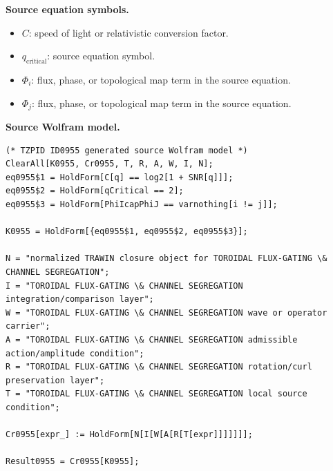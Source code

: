 \begin{minipage}[t]{0.49\linewidth}
\begingroup
\small
\raggedright
\textbf{Source equation symbols.}\par
\begin{itemize}[leftmargin=1.35em,itemsep=1pt,topsep=1pt,parsep=0pt]
    \item $C$: speed of light or relativistic conversion factor.
    \item $q_{\mathrm{critical}}$: source equation symbol.
    \item $\Phi_i$: flux, phase, or topological map term in the source equation.
    \item $\Phi_j$: flux, phase, or topological map term in the source equation.
\end{itemize}
\endgroup
\end{minipage}\hfill
\begin{minipage}[t]{0.47\linewidth}
\begingroup
\scriptsize
\raggedright
\textbf{Source Wolfram model.}\par
\begin{Verbatim}[fontsize=\tiny,breaklines=true,breakanywhere=true]
(* TZPID ID0955 generated source Wolfram model *)
ClearAll[K0955, Cr0955, T, R, A, W, I, N];
eq0955$1 = HoldForm[C[q] == log2[1 + SNR[q]]];
eq0955$2 = HoldForm[qCritical == 2];
eq0955$3 = HoldForm[PhiIcapPhiJ == varnothing[i != j]];

K0955 = HoldForm[{eq0955$1, eq0955$2, eq0955$3}];

N = "normalized TRAWIN closure object for TOROIDAL FLUX-GATING \& CHANNEL SEGREGATION";
I = "TOROIDAL FLUX-GATING \& CHANNEL SEGREGATION integration/comparison layer";
W = "TOROIDAL FLUX-GATING \& CHANNEL SEGREGATION wave or operator carrier";
A = "TOROIDAL FLUX-GATING \& CHANNEL SEGREGATION admissible action/amplitude condition";
R = "TOROIDAL FLUX-GATING \& CHANNEL SEGREGATION rotation/curl preservation layer";
T = "TOROIDAL FLUX-GATING \& CHANNEL SEGREGATION local source condition";

Cr0955[expr_] := HoldForm[N[I[W[A[R[T[expr]]]]]]];

Result0955 = Cr0955[K0955];
\end{Verbatim}
\endgroup
\end{minipage}

